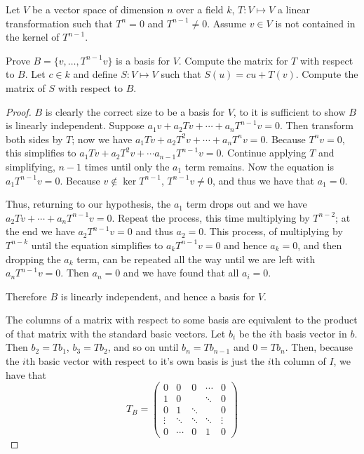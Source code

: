 \documentclass{article}
\newenvironment{problem}[2][Problem]{\begin{trivlist}
\item[\hskip \labelsep {\bfseries #1}\hskip \labelsep {\bfseries #2.}]}{\end{trivlist}}
\begin{document}

\begin{problem}{2}
    Let $V$ be a vector space of dimension $n$ over a field $k$, $T: V \mapsto V$ a linear transformation such that $T^n = 0$ and $T^{n - 1} \ne 0$. Assume $v \in V$ is not contained in the kernel of $T^{n - 1}$.

    Prove $B = \{v, \dots, T^{n - 1}v\}$ is a basis for $V$. Compute the matrix for $T$ with respect to $B$. Let $c \in k$ and define $S: V \mapsto V$ such that $S(u) = cu + T(v)$. Compute the matrix of $S$ with respect to $B$.
\end{problem}

\begin{proof}
    $B$ is clearly the correct size
    to be a basis for $V$, to it is sufficient to show $B$ is linearly independent. Suppose $a_1 v + a_2 Tv + \cdots + a_n T^{n - 1}v = 0$. Then transform both sides by $T$; now we have $a_1 Tv + a_2 T^2 v + \cdots + a_n T^n v = 0$. Because $T^n v = 0$, this simplifies to $a_1 Tv + a_2 T^2 v + \cdots a_{n - 1} T^{n - 1} v = 0$. Continue applying $T$ and simplifying, $n - 1$ times until only the $a_1$ term remains. Now the equation is $a_1 T^{n - 1} v = 0$. Because $v \notin \ker T^{n - 1}$, $T^{n - 1} v \ne 0$, and thus we have that $a_1 = 0$.

    Thus, returning to our hypothesis, the $a_1$ term drops out and we have $a_2 Tv + \cdots + a_n T^{n - 1} v = 0$. Repeat the process, this time multiplying by $T^{n - 2}$; at the end we have $a_2 T^{n - 1} v = 0$ and thus $a_2 = 0$. This process, of multiplying by $T^{n - k}$ until the equation simplifies to $a_k T^{n - 1} v = 0$ and hence $a_k = 0$, and then dropping the $a_k$ term, can be repeated all the way until we are left with $a_n T^{n - 1} v = 0$. Then $a_n = 0$ and we have found that all $a_i = 0$. 

    Therefore $B$ is linearly independent, and hence a basis for $V$.

    The columns of a matrix with respect to some basis are equivalent to the product of that matrix with the standard basic vectors. Let $b_i$ be the $i$th basis vector in $b$. Then $b_2 = T b_1$, $b_3 = T b_2$, and so on until $b_n = T b_{n - 1}$ and $0 = T b_n$. Then, because the $i$th basic vector with respect to it's own basis is just the $i$th column of $I$, we have that
    $$T_B = \begin{pmatrix}
        0 & 0 & 0 & \cdots & 0\\
        1 & 0 & & \ddots & 0  \\
        0 & 1 &  \ddots & & 0 \\
        \vdots & \ddots  & \ddots &\ddots  & \vdots \\
        0 & \cdots & 0 & 1 & 0
    \end{pmatrix}$$    


\end{proof}
\end{document}
